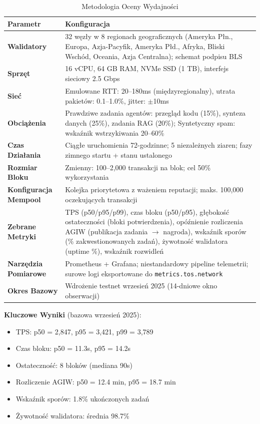 \documentclass[11pt]{article}
\begin{document}
\begin{table}[H]
\centering
\caption{Metodologia Oceny Wydajności}
\label{tab:evaluation-methodology}
\begin{tabular}{@{}p{}p{}@{}}
\toprule
\textbf{Parametr} & \textbf{Konfiguracja} \\ \midrule
\textbf{Walidatory} & 32 węzły w 8 regionach geograficznych (Ameryka Płn., Europa, Azja-Pacyfik, Ameryka Płd., Afryka, Bliski Wschód, Oceania, Azja Centralna); schemat podpisu BLS \\
\textbf{Sprzęt} & 16 vCPU, 64 GB RAM, NVMe SSD (1 TB), interfejs sieciowy 2.5 Gbps \\
\textbf{Sieć} & Emulowane RTT: 20--180ms (międzyregionalny), utrata pakietów: 0.1--1.0\%, jitter: $\pm$10ms \\
\textbf{Obciążenia} & Prawdziwe zadania agentów: przegląd kodu (15\%), synteza danych (25\%), zadania RAG (20\%); Syntetyczny spam: wskaźnik wstrzykiwania 20--60\% \\
\textbf{Czas Działania} & Ciągłe uruchomienia 72-godzinne; 5 niezależnych ziaren; fazy zimnego startu + stanu ustalonego \\
\textbf{Rozmiar Bloku} & Zmienny: 100--2,000 transakcji na blok; cel 50\% wykorzystania \\
\textbf{Konfiguracja Mempool} & Kolejka priorytetowa z ważeniem reputacji; maks. 100,000 oczekujących transakcji \\
\textbf{Zebrane Metryki} & TPS (p50/p95/p99), czas bloku (p50/p95), głębokość ostateczności (bloki potwierdzenia), opóźnienie rozliczenia AGIW (publikacja zadania $\rightarrow$ nagroda), wskaźnik sporów (\% zakwestionowanych zadań), żywotność walidatora (uptime \%), wskaźnik rozwidleń \\
\textbf{Narzędzia Pomiarowe} & Prometheus + Grafana; niestandardowy pipeline telemetrii; surowe logi eksportowane do \texttt{metrics.tos.network} \\
\textbf{Okres Bazowy} & Wdrożenie testnet wrzesień 2025 (14-dniowe okno obserwacji) \\
\bottomrule
\end{tabular}
\end{table}

\textbf{Kluczowe Wyniki} (bazowa wrzesień 2025):
\begin{itemize}[noitemsep]
  \item TPS: p50 = 2,847, p95 = 3,421, p99 = 3,789
  \item Czas bloku: p50 = 11.3s, p95 = 14.2s
  \item Ostateczność: 8 bloków (mediana 90s)
  \item Rozliczenie AGIW: p50 = 12.4 min, p95 = 18.7 min
  \item Wskaźnik sporów: 1.8\% ukończonych zadań
  \item Żywotność walidatora: średnia 98.7\%
\end{itemize}
\end{document}
